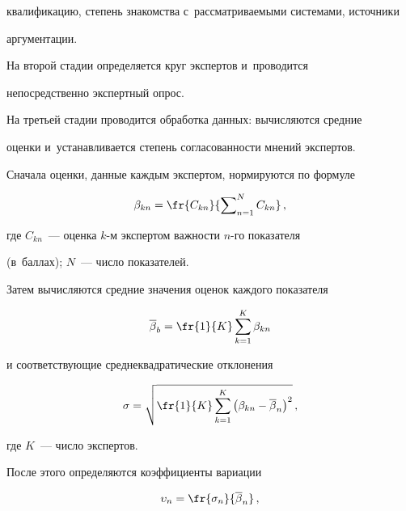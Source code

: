 квалификацию, степень знакомства с~рассматриваемыми системами, источники 

аргументации.

  

  На второй стадии определяется круг экспертов и~проводится 

непосредственно экспертный опрос.

  

  На третьей стадии проводится обработка данных: вычисляются средние 

оценки и~устанавливается степень согласованности мнений экспертов. 

  

  Сначала оценки, данные каждым экспертом, нормируются по формуле

  \begin{equation*}

  \beta_{kn} = \fr{C_{kn}}{\sum\nolimits_{n=1}^N C_{kn}}\,,


  \end{equation*}

где $C_{kn}$~--- оценка $k$-м экспертом важности $n$-го показателя 

(в~баллах); $N$~--- число показателей.

  

  Затем вычисляются средние значения оценок каждого показателя

  \begin{equation*}

  \overline{\beta}_b=\fr{1}{K} \sum\limits^K_{k=1} \beta_{kn}


  \end{equation*}

и соответствующие среднеквадратические отклонения 

\begin{equation*}

\sigma= \sqrt{\fr{1}{K} \sum\limits^K_{k=1} \left( \beta_{kn}-

\overline{\beta}_n\right)^2}\,,


\end{equation*}

где $K$~--- число экспертов. 



После этого определяются коэффициенты вариации

\begin{equation*}

\upsilon_n=\fr{\sigma_n}{\overline{\beta}_n}\,,


\end{equation*}

